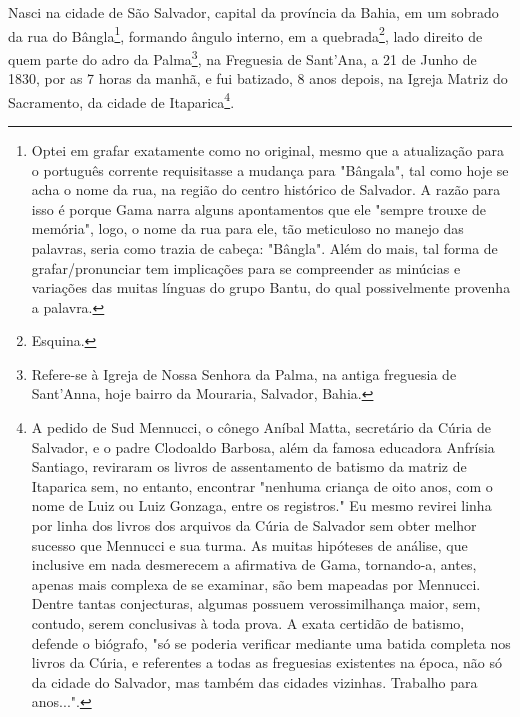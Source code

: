 Nasci na cidade de São Salvador, capital da província da Bahia, em um
sobrado da rua do Bângla\footnote{Optei em grafar exatamente como no
  original, mesmo que a atualização para o português corrente
  requisitasse a mudança para "Bângala", tal como hoje se acha o nome da
  rua, na região do centro histórico de Salvador. A razão para isso é
  porque Gama narra alguns apontamentos que ele "sempre trouxe de
  memória", logo, o nome da rua para ele, tão meticuloso no manejo das
  palavras, seria como trazia de cabeça: "Bângla". Além do mais, tal
  forma de grafar/pronunciar tem implicações para se compreender as
  minúcias e variações das muitas línguas do grupo Bantu, do qual
  possivelmente provenha a palavra.}, formando ângulo interno, em a
quebrada\footnote{Esquina.}, lado direito de quem parte do adro da
Palma\footnote{Refere-se à Igreja de Nossa Senhora da Palma, na antiga
  freguesia de Sant'Anna, hoje bairro da Mouraria, Salvador, Bahia.}, na
Freguesia de Sant'Ana, a 21 de Junho de 1830, por as 7 horas da manhã, e
fui batizado, 8 anos depois, na Igreja Matriz do Sacramento, da cidade
de Itaparica\footnote{A pedido de Sud Mennucci, o cônego Aníbal Matta,
  secretário da Cúria de Salvador, e o padre Clodoaldo Barbosa, além da
  famosa educadora Anfrísia Santiago, reviraram os livros de
  assentamento de batismo da matriz de Itaparica sem, no entanto,
  encontrar "nenhuma criança de oito anos, com o nome de Luiz ou Luiz
  Gonzaga, entre os registros." Eu mesmo revirei linha por linha dos
  livros dos arquivos da Cúria de Salvador sem obter melhor sucesso que
  Mennucci e sua turma. As muitas hipóteses de análise, que inclusive em
  nada desmerecem a afirmativa de Gama, tornando-a, antes, apenas mais
  complexa de se examinar, são bem mapeadas por Mennucci. Dentre tantas
  conjecturas, algumas possuem verossimilhança maior, sem, contudo,
  serem conclusivas à toda prova. A exata certidão de batismo, defende o
  biógrafo, "só se poderia verificar mediante uma batida completa nos
  livros da Cúria, e referentes a todas as freguesias existentes na
  época, não só da cidade do Salvador, mas também das cidades vizinhas.
  Trabalho para anos...".}.


